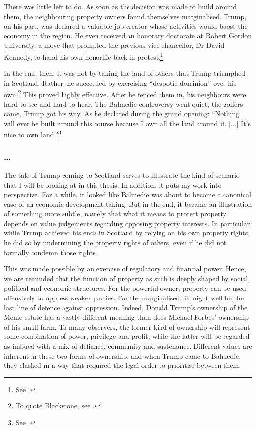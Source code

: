 There was little left to do. As soon as the decision was made to build around them, the neighbouring property owners found themselves marginalised. Trump, on his part, was declared a valuable job-creator whose activities would boost the economy in the region. He even received an honorary doctorate at Robert Gordon University, a move that prompted the previous vice-chancellor, Dr David Kennedy, to hand his own honorific back in protest.\footnote{See \cite{bbc10b}.}

In the end, then, it was not by taking the land of others that Trump triumphed in Scotland. Rather, he succeeded by exercising ``despotic dominion'' over his own.\footnote{To quote Blackstone, see \cite[2]{blackstone79b}.} This proved highly effective. After he fenced them in, his neighbours were hard to see and hard to hear. The Balmedie controversy went quiet, the golfers came, Trump got his way. As he declared during the grand opening: ``Nothing will ever be built around this course because I own all the land around it. [...] It's nice to own land.''\footnote{See \cite{booth12}.}

\subsubsection*{\ldots}

The tale of Trump coming to Scotland serves to illustrate the kind of scenario that I will be looking at in this thesis. In addition, it puts my work into perspective. For a while, it looked like Balmedie was about to become a canonical case of an economic development taking. But in the end, it became an illustration of something more subtle, namely that what it means to protect property depends on value judgements regarding opposing property interests. In particular, while Trump achieved his ends in Scotland by relying on his own property rights, he did so by undermining the property rights of others, even if he did not formally condemn those rights.

This was made possible by an exercise of regulatory and financial power. Hence, we are reminded that the function of property as such is deeply shaped by social, political and economic structures. For the powerful owner, property can be used offensively to oppress weaker parties. For the marginalised, it might well be the last line of defence against oppression. Indeed, Donald Trump's ownership of the Menie estate has a vastly different meaning than does Michael Forbes' ownership of his small farm. To many observers, the former kind of ownership will represent some combination of power, privilege and profit, while the latter will be regarded as imbued with a mix of defiance, community and sustenance. Different values are inherent in these two forms of ownership, and when Trump came to Balmedie, they clashed in a way that required the legal order to prioritise between them.

